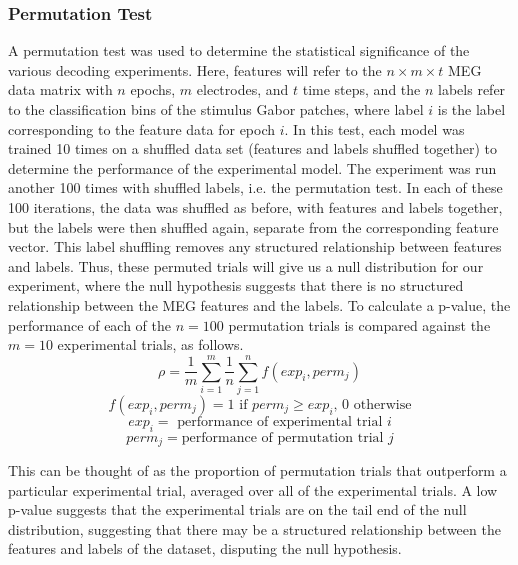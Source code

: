 \documentclass[../main.tex]{subfiles}
\begin{document}
\subsubsection{Permutation Test}
A permutation test was used to determine the statistical significance of the various decoding experiments. Here, features will refer to the $n \times m \times t$ MEG data matrix with $n$ epochs, $m$ electrodes, and $t$ time steps, and the $n$ labels refer to the classification bins of the stimulus Gabor patches, where label $i$ is the label corresponding to the feature data for epoch $i$. In this test, each model was trained 10 times on a shuffled data set (features and labels shuffled together) to determine the performance of the experimental model.  The experiment was run another 100 times with shuffled labels, i.e. the permutation test. In each of these 100 iterations, the data was shuffled as before, with features and labels together, but the labels were then shuffled again, separate from the corresponding feature vector. This label shuffling removes any structured relationship between features and labels. Thus, these permuted trials will give us a null distribution for our experiment, where the null hypothesis suggests that there is no structured relationship between the MEG features and the labels. To calculate a p-value, the performance of each of the $n = 100$ permutation trials is compared against the $m = 10$ experimental trials, as follows. 
$$\rho = \frac{1}{m}\sum_{i=1}^{m}{\frac{1}{n}\sum_{j=1}^{n}{f(exp_i, perm_j)}}$$
$$f(exp_i, perm_j) = 1 \mbox{ if } perm_j \geq exp_i \mbox{, } 0 \mbox{ otherwise}$$
$$ exp_i = \mbox{ performance of experimental trial } i$$
$$ perm_j = \mbox{performance of permutation trial } j $$

This can be thought of as the proportion of permutation trials that outperform a particular experimental trial, averaged over all of the experimental trials. A low p-value suggests that the experimental trials are on the tail end of the null distribution, suggesting that there may be a structured relationship between the features and labels of the dataset, disputing the null hypothesis.
\end{document}
